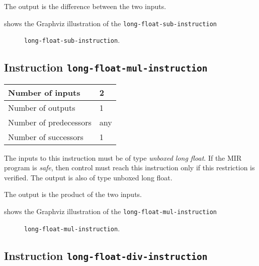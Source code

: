The output is the difference between the two inputs.

 shows the Graphviz illustration of the
\texttt{long-float-sub-instruction}

\begin{figure}
\begin{center}
\end{center}
\caption{\label{fig-long-float-sub-instruction}
\texttt{long-float-sub-instruction}.}
\end{figure}

\subsection{Instruction \texttt{long-float-mul-instruction}}
\label{mir-instruction-long-float-mul}

\begin{tabular}{|l|l|}
\hline
Number of inputs & 2\\
\hline
Number of outputs & 1\\
\hline
Number of predecessors & any\\
\hline
Number of successors & 1\\
\hline
\end{tabular}

The inputs to this instruction must be of type \emph{unboxed long
  float}.  If the MIR program is \emph{safe}, then control must reach
this instruction only if this restriction is verified.  The output is
also of type unboxed long float.

The output is the product of the two inputs.

 shows the Graphviz illustration of the
\texttt{long-float-mul-instruction}

\begin{figure}
\begin{center}
\end{center}
\caption{\label{fig-long-float-mul-instruction}
\texttt{long-float-mul-instruction}.}
\end{figure}

\subsection{Instruction \texttt{long-float-div-instruction}}
\label{mir-instruction-long-float-div}

